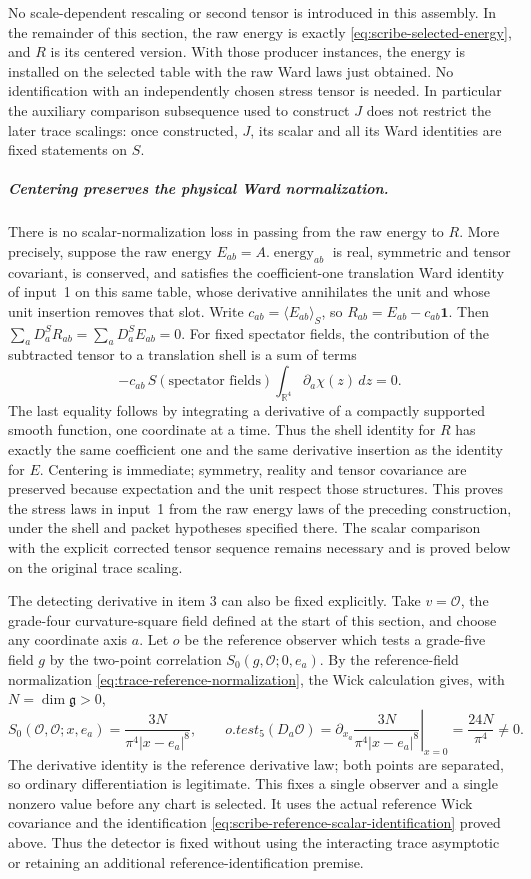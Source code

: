 No scale-dependent rescaling or second tensor is introduced in this
assembly. In the remainder of this section, the raw energy is exactly
\eqref{eq:scribe-selected-energy}, and $R$ is its centered version.
With those producer instances, the energy is installed on the selected
table with the raw Ward laws just obtained. No identification with an independently chosen
stress tensor is needed. In particular the auxiliary comparison
subsequence used to construct $J$ does not restrict the later trace
scalings: once constructed, $J$, its scalar and all its Ward identities
are fixed statements on $S$.

\subparagraph{Centering preserves the physical Ward normalization.}
There is no scalar-normalization loss in passing from the raw energy to
$R$. More precisely, suppose the raw energy $E_{ab}=A.\operatorname{energy}_{ab}$
is real, symmetric and tensor covariant, is conserved, and satisfies the
coefficient-one translation Ward identity
of input~1 on this same table, whose derivative annihilates the unit and
whose unit insertion removes that slot. Write
$c_{ab}=\langle E_{ab}\rangle_S$, so $R_{ab}=E_{ab}-c_{ab}\mathbf1$.
Then $\sum_a D_a^S R_{ab}=\sum_a D_a^S E_{ab}=0$.
For fixed spectator fields, the contribution of the subtracted tensor
to a translation shell is a sum of terms
\[
 -c_{ab}\,S(\text{spectator fields})
          \int_{\mathbb R^4}\partial_a\chi(z)\,dz=0.
\]
The last equality follows by integrating a derivative of a compactly
supported smooth function, one coordinate at a time. Thus the shell
identity for $R$ has exactly the same coefficient one and the same
derivative insertion as the identity for $E$. Centering is immediate;
symmetry, reality and tensor covariance are preserved because expectation
and the unit respect those structures. This proves the stress laws in
input~1 from the raw energy laws of the preceding construction, under
the shell and packet hypotheses specified there.
The scalar comparison with the explicit corrected tensor sequence
remains necessary and is proved below on the original trace scaling.

The detecting derivative in item 3 can also be fixed explicitly.
Take $v=\mathcal O$, the grade-four curvature-square field defined at
the start of this section, and choose any coordinate axis $a$. Let $o$
be the reference observer which tests a grade-five field $g$ by the
two-point correlation $S_0(g,\mathcal O;0,e_a)$. By the reference-field normalization
\eqref{eq:trace-reference-normalization}, the Wick calculation gives, with
$N=\dim\mathfrak g>0$,
\[
 S_0(\mathcal O,\mathcal O;x,e_a)
       =\frac{3N}{\pi^4|x-e_a|^8},\qquad
 o.test_5(D_a\mathcal O)
       =\left.\partial_{x_a}\frac{3N}{\pi^4|x-e_a|^8}
         \right|_{x=0}=\frac{24N}{\pi^4}\ne0.
\]
The derivative identity is the reference derivative law; both points
are separated, so ordinary differentiation is legitimate. This fixes a
single observer and a single nonzero value before any chart is selected.
It uses the actual reference Wick covariance and the identification
\eqref{eq:scribe-reference-scalar-identification} proved above. Thus the
detector is fixed without using the interacting trace asymptotic or
retaining an additional reference-identification premise.

